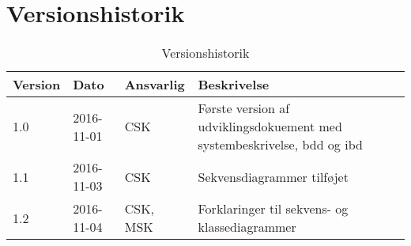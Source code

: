 \chapter{Versionshistorik}\label{Versionshistorik}

\begin{table}[htb]
\begin{tabular}{ | l | l | l | p{} | }
\hline
\textbf{Version} & \textbf{Dato} & \textbf{Ansvarlig} & \textbf{Beskrivelse} \\\hline
1.0 & 2016-11-01 & CSK & Første version af udviklingsdokuement med systembeskrivelse, bdd og ibd\\\hline
1.1 & 2016-11-03 & CSK & Sekvensdiagrammer tilføjet  \\\hline
1.2 & 2016-11-04 & CSK, MSK & Forklaringer til sekvens- og klassediagrammer \\\hline
\end{tabular}
\caption{Versionshistorik}
\end{table}